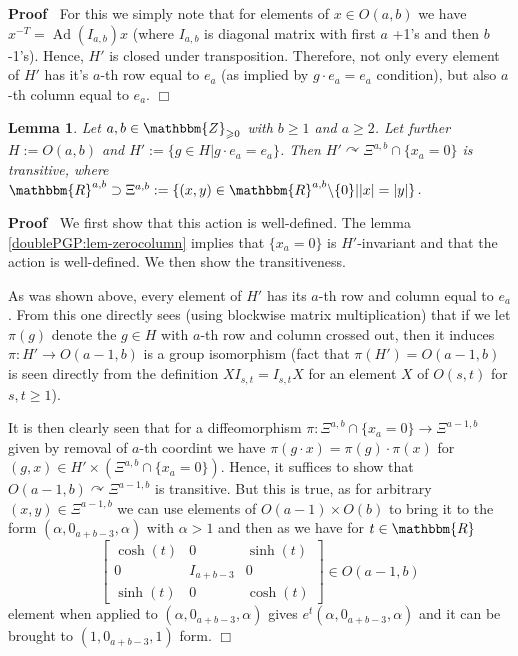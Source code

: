 \documentclass{article}
\newcommand{\assign}{:=}
\newcommand{\tmop}[1]{\ensuremath{\operatorname{#1}}}
\renewenvironment{proof}{\noindent\textbf{Proof\ }}{\hspace*{\fill}$\Box$\medskip}
\newtheorem{lemma}[proposition]{Lemma}
\theoremstyle{remark}
\begin{document}
\begin{proof}
  For this we simply note that for elements of $x \in O (a, b)$ we have $x^{-
  T} = \tmop{Ad} (I_{a, b}) x$ (where $I_{a, b}$ is diagonal matrix with first
  $a$ +1's and then $b$ -1's). Hence, $H'$ is closed under transposition.
  Therefore, not only every element of $H'$ has it's $a$-th row equal to $e_a$
  (as implied by $g \cdot e_a = e_a$ condition), but also $a$-th column equal
  to $e_a$.
\end{proof}

\begin{lemma}
  \label{doublePGP:lem-Gp-act-Xi}Let $a, b \in \mathbbm{Z}_{\geqslant 0}$ with
  $b \geqslant 1$ and $a \geqslant 2$. Let further $H \assign O (a, b)$ and
  $H' \assign \{g \in H|g \cdot e_a = e_a \}$. Then $H' \curvearrowright
  \Xi^{a, b} \cap \{ x_a = 0 \}$ is transitive, where $\mathbbm{R}^{a, b}
  \supset \Xi^{a, b} \assign \{ (x, y) \in \mathbbm{R}^{a, b} \backslash \{ 0
  \} |  | x | = | y | \}$.
\end{lemma}

\begin{proof}
  We first show that this action is well-defined. The lemma
  \ref{doublePGP:lem-zerocolumn} implies that $\{ x_a = 0 \}$ is
  $H'$-invariant and that the action is well-defined. We then show the
  transitiveness.
  
  As was shown above, every element of $H'$ has its $a$-th row and column
  equal to $e_a$. From this one directly sees (using blockwise matrix
  multiplication) that if we let $\pi (g)$ denote the $g \in H$ with $a$-th
  row and column crossed out, then it induces $\pi : H' \rightarrow O (a - 1,
  b)$ is a group isomorphism (fact that $\pi (H') = O (a - 1, b)$ is seen
  directly from the definition $X I_{s, t} = I_{s, t} X$ for an element $X$ of
  $O (s, t)$ for $s, t \geqslant 1$).
  
  It is then clearly seen that for a diffeomorphism $\pi : \Xi^{a, b} \cap \{
  x_a = 0 \} \rightarrow \Xi^{a - 1, b}$ given by removal of $a$-th coordint
  we have $\pi (g \cdot x) = \pi (g) \cdot \pi (x)$ for $(g, x) \in H' \times
  (\Xi^{a, b} \cap \{ x_a = 0 \})$. Hence, it suffices to show that $O (a - 1,
  b) \curvearrowright \Xi^{a - 1, b}$ is transitive. But this is true, as for
  arbitrary $(x, y) \in \Xi^{a - 1, b}$ we can use elements of $O (a - 1)
  \times O (b)$ to bring it to the form $(\alpha, 0_{a + b - 3}, \alpha)$ with
  $\alpha > 1$ and then as we have for $t \in \mathbbm{R}$
  \[ \left[ \begin{array}{lll}
       \cosh (t) & 0 & \sinh (t)\\
       0 & I_{a + b - 3} & 0\\
       \sinh (t) & 0 & \cosh (t)
     \end{array} \right] \in O (a - 1, b) \]
  element when applied to $(\alpha, 0_{a + b - 3}, \alpha)$ gives $e^t
  (\alpha, 0_{a + b - 3}, \alpha)$ and it can be brought to $(1, 0_{a + b -
  3}, 1)$ form.
\end{proof}
\end{document}
